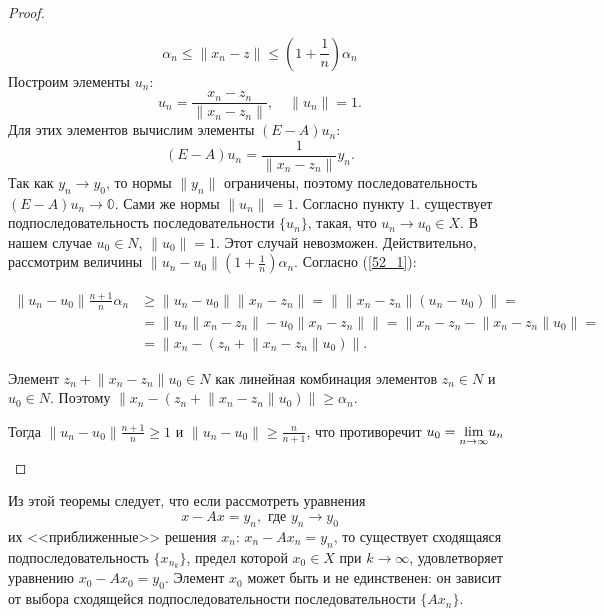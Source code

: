 \documentclass[12pt,a4paper,titlepage,oneside]{book}
\theoremstyle{definition}
\theoremstyle{plain}
\theoremstyle{break}
\theoremstyle{remark}
\theoremstyle{remark}
\theoremstyle{remark}
\theoremstyle{remark}
\theoremstyle{plain}
\theoremstyle{plain}
\begin{document}
\begin{proof}
\begin{enumerate}
\begin{equation}
\label{52_1}
\alpha_n \leqslant \lVert x_n-z \rVert \leqslant (1+\frac{1}{n})\alpha_n
\end{equation}	
Построим элементы $u_n$: 
$$ u_n = \frac{x_n - z_n}{\lVert x_n - z_n \rVert}, \quad \lVert u_n \rVert = 1.$$
Для этих элементов вычислим элементы $(E-A)u_n$:
\begin{equation*}
(E-A)u_n=\frac{1}{\lVert x_n-z_n \rVert}y_n.
\end{equation*}	
Так как $y_n \rightarrow y_0$, то нормы $\lVert y_n \rVert$ ограничены, поэтому последовательность $(E-A)u_n \rightarrow \mathbb{0}$. Сами же нормы $\lVert u_n \rVert=1$. Согласно пункту $1.$ существует подпоследовательность последовательности $\{u_n\}$, такая, что $u_n \rightarrow u_0 \in X$. В нашем случае $u_0 \in N$, $\lVert u_0 \rVert=1$. Этот случай невозможен. Действительно, рассмотрим величины $\lVert u_n-u_0 \rVert(1+ \frac{1}{n})\alpha_n$. Согласно (\ref{52_1}):

\begin{align*}
\lVert u_n-u_0 \rVert \frac{n+1}{n} \alpha_n &\geqslant \lVert u_n-u_0 \rVert\lVert x_n-z_n \rVert = \lVert \lVert x_n-z_n \rVert(u_n-u_0) \rVert=\\
&=\lVert u_n\lVert x_n-z_n \rVert-u_0\lVert x_n-z_n \rVert \rVert=\lVert x_n-z_n-\lVert x_n-z_n \rVert u_0 \rVert =\\
&= \lVert x_n-(z_n+\lVert x_n-z_n \rVert u_0) \rVert.
\end{align*}

Элемент $z_n+\lVert x_n-z_n \rVert u_0 \in N$ как линейная комбинация элементов $z_n \in N$ и $u_0 \in N$. Поэтому $\lVert x_n-(z_n+\lVert x_n-z_n \rVert u_0) \rVert \geqslant \alpha_n$.

Тогда $\lVert u_n-u_0 \rVert \frac{n+1}{n} \geqslant 1$ и $\lVert u_n-u_0 \rVert \geqslant\frac{n}{n+1}$, что противоречит $u_0= \smash{\displaystyle\lim_{n \rightarrow \infty}}u_n$
\qedhere
\end{enumerate}
\end{proof}
	
	Из этой теоремы следует, что если рассмотреть уравнения 
	\begin{equation*}
	x-Ax=y_n, \mbox{ где } y_n \rightarrow y_0 
	\end{equation*}	
их <<приближенные>> решения $x_n$: $x_n-Ax_n=y_n$, то существует сходящаяся подпоследовательность $\{x_{n_k}\}$, предел которой $x_0 \in X$ при $k \rightarrow \infty$, удовлетворяет уравнению $x_0-Ax_0=y_0$. Элемент $x_0$ может быть и не единственен: он зависит от выбора сходящейся подпоследовательности последовательности $\{Ax_n\}$.
\end{document}
